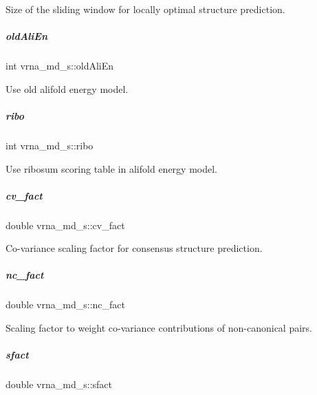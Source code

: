 Size of the sliding window for locally optimal structure prediction. 

\mbox{\label{group__model__details_ab53aec4503130877973c6111ae6f0f76}} 
\subparagraph{\texorpdfstring{old\+Ali\+En}{oldAliEn}}
{\footnotesize\ttfamily int vrna\+\_\+md\+\_\+s\+::old\+Ali\+En}



Use old alifold energy model. 

\mbox{\label{group__model__details_a3df2ae4bd9c133ef8ab92a53b1d035ec}} 
\subparagraph{\texorpdfstring{ribo}{ribo}}
{\footnotesize\ttfamily int vrna\+\_\+md\+\_\+s\+::ribo}



Use ribosum scoring table in alifold energy model. 

\mbox{\label{group__model__details_a62ebefb9d0643e5c4c8a2ec84a105ce6}} 
\subparagraph{\texorpdfstring{cv\+\_\+fact}{cv\_fact}}
{\footnotesize\ttfamily double vrna\+\_\+md\+\_\+s\+::cv\+\_\+fact}



Co-\/variance scaling factor for consensus structure prediction. 

\mbox{\label{group__model__details_abcf568e6124bfcb2f847ff4eb0dfded6}} 
\subparagraph{\texorpdfstring{nc\+\_\+fact}{nc\_fact}}
{\footnotesize\ttfamily double vrna\+\_\+md\+\_\+s\+::nc\+\_\+fact}



Scaling factor to weight co-\/variance contributions of non-\/canonical pairs. 

\mbox{\label{group__model__details_ab6f4cabaa9b4726b13592486d5bc21c7}} 
\subparagraph{\texorpdfstring{sfact}{sfact}}
{\footnotesize\ttfamily double vrna\+\_\+md\+\_\+s\+::sfact}



